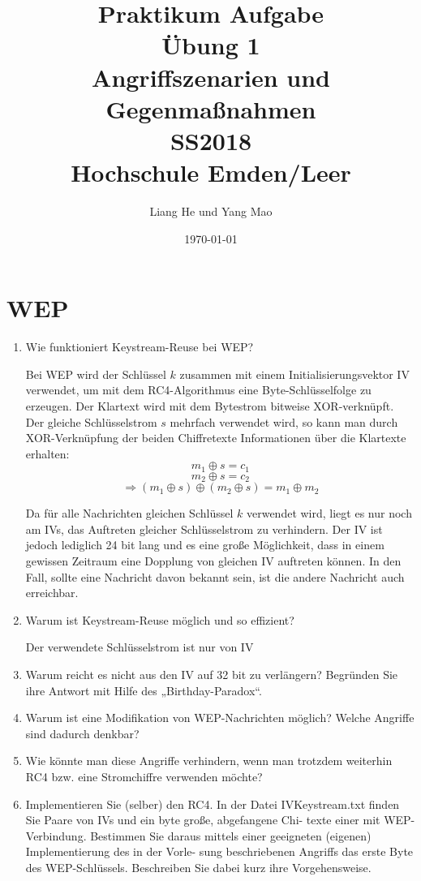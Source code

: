 \documentclass[12pt,a4paper]{article}
\title{	
\textbf{Praktikum Aufgabe\\
		Übung 1\\}
	    Angriffszenarien und\\ Gegenmaßnahmen \\
		SS2018\\
		Hochschule Emden/Leer}
\author{Liang He und Yang Mao}
\date{\today}
\newenvironment{exercise}
	{\begin{enumerate}[label=\bfseries\alph*).]\bfseries}
{\end{enumerate}}
\newenvironment{answer}{\par\normalfont}{}
\begin{document}
    \maketitle
    \newpage
    
    \tableofcontents
    \newpage
    \section{WEP}
    	\begin{exercise}
		\item Wie funktioniert Keystream-Reuse bei WEP?
			\begin{answer}
			Bei WEP wird der Schlüssel $k$ zusammen mit einem Initialisierungsvektor IV verwendet, um mit dem RC4-Algorithmus eine Byte-Schlüsselfolge zu erzeugen. Der Klartext wird mit dem Bytestrom bitweise XOR-verknüpft.\\
			Der gleiche Schlüsselstrom $s$ mehrfach verwendet wird, so kann man durch XOR-Verknüpfung der beiden Chiffretexte Informationen über die Klartexte erhalten:
			\[m_1 \oplus s = c_1\]
			\[m_2 \oplus s = c_2\]
			\[\Rightarrow (m_1 \oplus s)\oplus(m_2\oplus s)=m_1\oplus m_2\]
			
			Da für alle Nachrichten gleichen Schlüssel $k$ verwendet wird, liegt es nur noch am IVs, das Auftreten gleicher Schlüsselstrom zu verhindern. Der IV ist jedoch lediglich 24 bit lang und es eine große Möglichkeit, dass in einem gewissen Zeitraum eine Dopplung von gleichen IV auftreten können. In den Fall, sollte eine Nachricht davon bekannt sein, ist die andere Nachricht auch erreichbar.
			\end{answer}
		\item  Warum ist Keystream-Reuse möglich und so effizient?
		\begin{answer}
			Der verwendete Schlüsselstrom ist nur von IV 
		\end{answer}
		\item Warum reicht es nicht aus den IV auf 32 bit zu verlängern? Begründen Sie ihre Antwort mit
		Hilfe des „Birthday-Paradox“.
		\item  Warum ist eine Modifikation von WEP-Nachrichten möglich? Welche Angriffe sind dadurch	denkbar?
		\item  Wie könnte man diese Angriffe verhindern, wenn man trotzdem weiterhin RC4 bzw. eine
		Stromchiffre verwenden möchte?
		\item Implementieren Sie (selber) den RC4.
		In der Datei IVKeystream.txt finden Sie Paare von IVs und ein byte große, abgefangene Chi-
		texte einer mit WEP-Verbindung.
		Bestimmen Sie daraus mittels einer geeigneten (eigenen) Implementierung des in der Vorle-
		sung beschriebenen Angriffs das erste Byte des WEP-Schlüssels. Beschreiben Sie dabei kurz
		ihre Vorgehensweise.
    	\end{exercise}
    
\end{document}

